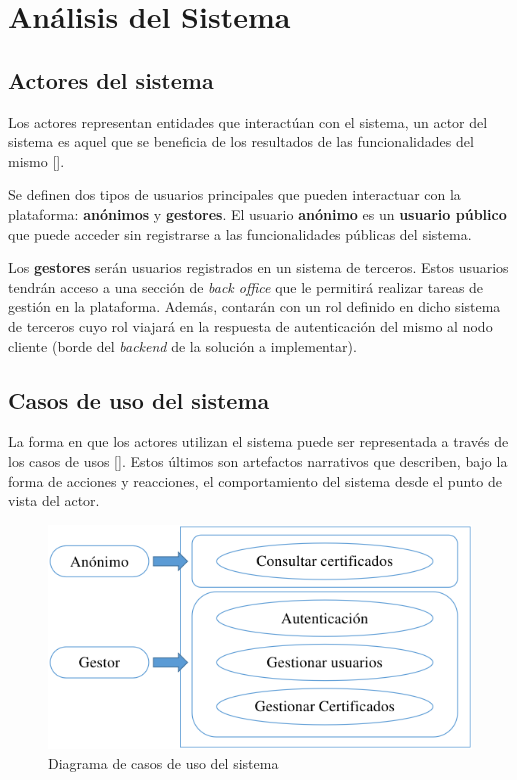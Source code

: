 \section{Análisis del Sistema}

\subsection{Actores del sistema}
Los actores representan entidades que interactúan con el sistema, un actor del sistema es aquel que se beneficia de los resultados de las funcionalidades del mismo [\cite{91}]. 

Se definen dos tipos de usuarios principales que pueden interactuar con la plataforma: \textbf{anónimos} y \textbf{gestores}. El usuario \textbf{anónimo} es un \textbf{usuario público} que puede acceder sin registrarse a las funcionalidades públicas del sistema.

Los \textbf{gestores} serán usuarios registrados en un sistema de terceros. Estos usuarios tendrán acceso a una sección de \textit{back office} que le permitirá realizar tareas de gestión en la plataforma. Además, contarán con un rol definido en dicho sistema de terceros cuyo rol viajará en la respuesta de autenticación del mismo al nodo cliente (borde del \textit{backend} de la solución a implementar).

\subsection{Casos de uso del sistema}
La forma en que los actores utilizan el sistema puede ser representada a través de los casos de usos [\cite{91}]. Estos últimos son artefactos narrativos que describen, bajo la forma de acciones y reacciones, el comportamiento del sistema desde el punto de vista del actor.

\begin{figure}[!h]
	\centering
	\includegraphics[width=\linewidth]{Graphics/caso-uso.png}
	\caption{Diagrama de casos de uso del sistema}
	\label{fig:11}
\end{figure}

